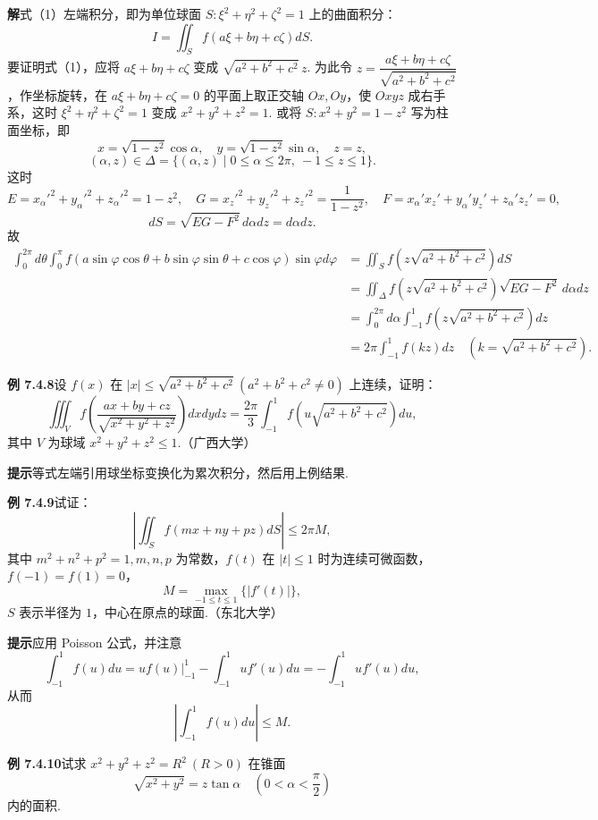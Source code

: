 \documentclass[UTF8,12pt,a4paper,fontset=fandol]{ctexart}
\begin{document}
\noindent\textbf{解}\quad 式（1）左端积分，即为单位球面 $S:\xi^2+\eta^2+\zeta^2=1$ 上的曲面积分：
\[
I=\iint_Sf(a\xi+b\eta+c\zeta)dS.
\]
要证明式（1），应将 $a\xi+b\eta+c\zeta$ 变成 $\sqrt{a^2+b^2+c^2}\,z$. 为此令 $z=\dfrac{a\xi+b\eta+c\zeta}{\sqrt{a^2+b^2+c^2}}$，作坐标旋转，在 $a\xi+b\eta+c\zeta=0$ 的平面上取正交轴 $Ox,Oy$，使 $Oxyz$ 成右手系，这时 $\xi^2+\eta^2+\zeta^2=1$ 变成 $x^2+y^2+z^2=1$. 或将 $S:x^2+y^2=1-z^2$ 写为柱面坐标，即
\[
x=\sqrt{1-z^2}\cos\alpha,\quad
y=\sqrt{1-z^2}\sin\alpha,\quad z=z,
\]
\[
(\alpha,z)\in\Delta=\{(\alpha,z)\mid0\le\alpha\le2\pi,\ -1\le z\le1\}.
\]
这时
\[
E=x_\alpha'^2+y_\alpha'^2+z_\alpha'^2=1-z^2,\quad
G=x_z'^2+y_z'^2+z_z'^2=\frac1{1-z^2},\quad
F=x_\alpha'x_z'+y_\alpha'y_z'+z_\alpha'z_z'=0,
\]
\[
dS=\sqrt{EG-F^2}\,d\alpha dz=d\alpha dz.
\]
故
\[
\begin{aligned}
\int_0^{2\pi}d\theta\int_0^\pi
f(a\sin\varphi\cos\theta+b\sin\varphi\sin\theta+c\cos\varphi)\sin\varphi d\varphi
&=\iint_Sf\left(z\sqrt{a^2+b^2+c^2}\right)dS\\
&=\iint_\Delta f\left(z\sqrt{a^2+b^2+c^2}\right)\sqrt{EG-F^2}\,d\alpha dz\\
&=\int_0^{2\pi}d\alpha\int_{-1}^1f\left(z\sqrt{a^2+b^2+c^2}\right)dz\\
&=2\pi\int_{-1}^1f(kz)dz\quad(k=\sqrt{a^2+b^2+c^2}).
\end{aligned}
\]

\noindent\textbf{例 7.4.8}\quad 设 $f(x)$ 在 $|x|\le\sqrt{a^2+b^2+c^2}\ (a^2+b^2+c^2\ne0)$ 上连续，证明：
\[
\iiint_Vf\left(\frac{ax+by+cz}{\sqrt{x^2+y^2+z^2}}\right)dxdydz
=\frac{2\pi}3\int_{-1}^1f\left(u\sqrt{a^2+b^2+c^2}\right)du,
\]
其中 $V$ 为球域 $x^2+y^2+z^2\le1$.（广西大学）

\noindent\textbf{提示}\quad 等式左端引用球坐标变换化为累次积分，然后用上例结果.

\noindent\textbf{例 7.4.9}\quad 试证：
\[
\left|\iint_S f(mx+ny+pz)dS\right|\le 2\pi M,
\]
其中 $m^2+n^2+p^2=1,m,n,p$ 为常数，$f(t)$ 在 $|t|\le1$ 时为连续可微函数，$f(-1)=f(1)=0$，
\[
M=\max_{-1\le t\le1}\{|f'(t)|\},
\]
$S$ 表示半径为 $1$，中心在原点的球面.（东北大学）

\noindent\textbf{提示}\quad 应用 Poisson 公式，并注意
\[
\int_{-1}^1f(u)du=uf(u)\big|_{-1}^1-\int_{-1}^1uf'(u)du
=-\int_{-1}^1uf'(u)du,
\]
从而
\[
\left|\int_{-1}^1f(u)du\right|\le M.
\]

\noindent\textbf{例 7.4.10}\quad 试求 $x^2+y^2+z^2=R^2\ (R>0)$ 在锥面
\[
\sqrt{x^2+y^2}=z\tan\alpha\quad\left(0<\alpha<\frac\pi2\right)
\]
内的面积.
\end{document}
